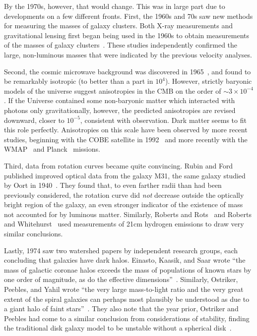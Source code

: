 By the 1970s, however, that would change. This was in large part due to
developments on a few different fronts. First, the 1960s and 70s saw new
methods for measuring the masses of galaxy clusters. Both X-ray measurements
and gravitational lensing first began being used in the 1960s to obtain
measurements of the masses of galaxy clusters~\cite{trimble_history_2013}.
These studies independently confirmed the large, non-luminous masses that were
indicated by the previous velocity analyses.

Second, the cosmic microwave background was discovered in
1965~\cite{penzias_measurement_1965,dicke_cosmic_1965}, and found to be
remarkably isotropic (to better than a part in \(10^4\)).  However, strictly
baryonic models of the universe suggest anisotropies in the CMB on the order
of \(\sim 3 \times 10^{-4}\).  If the Universe contained some non-baryonic
matter which interacted with photons only gravitationally, however, the
predicted anisotropies are revised downward, closer to \(10^{-5}\), consistent
with observation.  Dark matter seems to fit this role perfectly.  Anisotropies
on this scale have been observed by more recent studies, beginning with the
COBE satellite in 1992~\cite{smoot_structure_1992,efstathiou_cobe_1992} and
more recently with the WMAP~\cite{bennett_first-year_2003} and
Planck~\cite{planck_collaboration_planck_2011} missions.

Third, data from rotation curves became quite convincing. Rubin and Ford
published improved optical data from the galaxy M31, the same galaxy studied
by Oort in 1940~\cite{rubin_rotation_1970}. They found that, to even farther
radii than had been previously considered, the rotation curve did \emph{not}
decrease outside the optically bright region of the galaxy, an even stronger
indicator of the existence of mass not accounted for by luminous matter.
Similarly, Roberts and Rots~\cite{roberts_comparison_1973} and Roberts and
Whitehurst~\cite{roberts_rotation_1975} used measurements of 21cm hydrogen
emissions to draw very similar conclusions.

Lastly, 1974 saw two watershed papers by independent research groups, each
concluding that galaxies have dark halos. Einasto, Kaasik, and Saar wrote
``the mass of galactic coronae halos exceeds the mass of populations of known
stars by one order of magnitude, as do the effective
dimensions''~\cite{einasto_missing_1974}. Similarly, Ostriker, Peebles, and
Yahil wrote ``the very large mass-to-light ratio and the very great extent of
the spiral galaxies can perhaps most plausibly be understood as due to a giant
halo of faint stars''~\cite{ostriker_size_1974}. They also note that the year
prior, Ostriker and Peebles had come to a similar conclusion from
considerations of stability, finding the traditional disk galaxy model to be
unstable without a spherical disk~\cite{ostriker_numerical_1973}.

